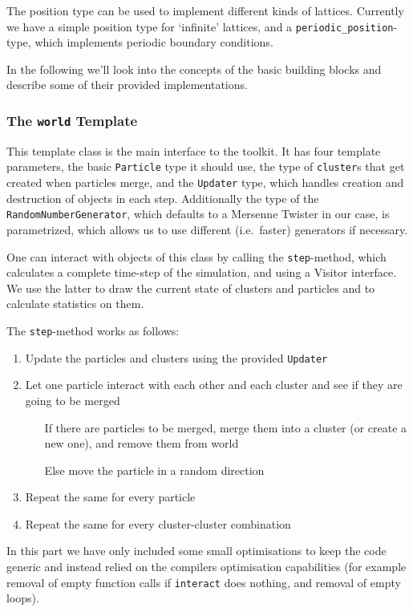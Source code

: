 \documentclass[twocolumn,10pt]{scrartcl}
\begin{document}
            The position type can be used to implement different kinds of lattices. Currently we have a simple position
            type for `infinite' lattices, and a \lstinline'periodic_position'-type, which implements periodic boundary
            conditions.

            In the following we'll look into the concepts of the basic building blocks and describe some of their
            provided implementations.

            \subsubsection{The \lstinline!world! Template}
                This template class is the main interface to the toolkit. It has four template parameters, the basic
                \lstinline!Particle! type it should use, the type of \lstinline!cluster!s that get created when
                particles merge, and the \lstinline!Updater! type, which handles creation and destruction of objects in
                each step.  Additionally the type of the \lstinline!RandomNumberGenerator!, which defaults to a Mersenne
                Twister in our case, is parametrized, which allows us to use different (i.e.\ faster) generators if
                necessary.

                One can interact with objects of this class by calling the \lstinline!step!-method, which calculates a
                complete time-step of the simulation, and using a Visitor interface. We use the latter to draw the
                current state of clusters and particles and to calculate statistics on them.

                The \lstinline!step!-method works as follows:
                \begin{enumerate}
                    \item Update the particles and clusters using the provided \lstinline!Updater!
                    \item Let one particle interact with each other and each cluster and see if they are going to be
                        merged
                        \begin{itemize}
                            \item[If] there are particles to be merged, merge them into a cluster (or create a new one),
                                and remove them from world
                            \item[Else] move the particle in a random direction
                        \end{itemize}
                    \item Repeat the same for every particle
                    \item Repeat the same for every cluster-cluster combination
                \end{enumerate}
                In this part we have only included some small optimisations to keep the code generic and instead relied
                on the compilers optimisation capabilities (for example removal of empty function calls if
                \lstinline'interact' does nothing, and removal of empty loops).
\end{document}
